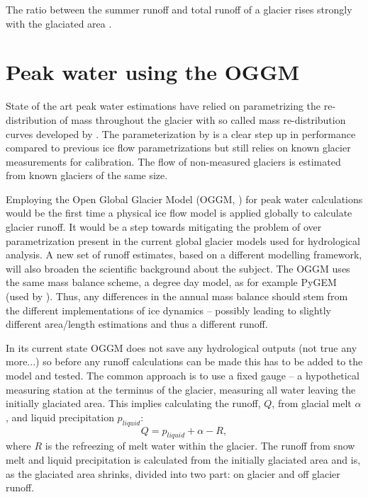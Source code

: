\documentclass[12pt, a4paper]{article}
\begin{document}
The ratio between the summer runoff and total runoff of a glacier rises strongly
with the glaciated area \parencite{janssonConceptGlacierStorage2003}.

\section{Peak water using the OGGM}
State of the art peak water estimations
\parencite{rounceGlacierMassChange2020,hussGlobalscaleHydrologicalResponse2018}
have relied on parametrizing the re-distribution of mass throughout the glacier
with so called mass re-distribution curves developed by
\textcite{hussFutureHighmountainHydrology2010}. The parameterization by
\textcite{hussFutureHighmountainHydrology2010} is a clear step up in
performance compared to previous ice flow parametrizations but still relies on
known glacier measurements for calibration. The flow of non-measured glaciers
is estimated from known glaciers of the same size. 

Employing the Open Global Glacier Model (OGGM,
\cite{maussionOpenGlobalGlacier2019}) for peak water calculations would be the
first time a physical ice flow model is applied globally to calculate glacier
runoff. It would be a step towards mitigating the problem of over
parametrization present in the current global glacier models used for
hydrological analysis. A new set of runoff estimates, based on a different
modelling framework, will also broaden the scientific background about the
subject. The OGGM uses the same mass balance scheme, a degree day model, as for
example PyGEM (used by \cite{rounceGlacierMassChange2020}). Thus, any
differences in the annual mass balance should stem from the different
implementations of ice dynamics -- possibly leading to slightly different
area/length estimations and thus a different runoff.

In its current state OGGM does not save any hydrological outputs (not true any
more...) so before any runoff calculations can be made this has to be added to
the model and tested. The common approach is to use a fixed gauge -- a
hypothetical measuring station at the terminus of the glacier, measuring all
water leaving the initially glaciated area. This implies calculating the runoff,
$Q$, from glacial melt $\alpha$, and liquid precipitation $p_{liquid}$:
\begin{equation}
    Q = p_{liquid} + \alpha - R,
\end{equation}
where $R$ is the refreezing of melt water within the glacier. The runoff from
snow melt and liquid precipitation is calculated from the initially glaciated
area and is, as the glaciated area shrinks, divided into two part: on glacier
and off glacier runoff. 



\printbibliography
\end{document}
